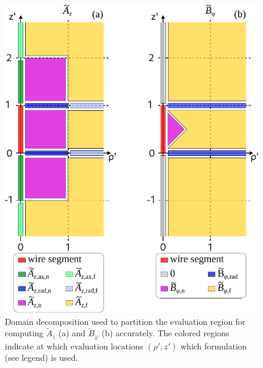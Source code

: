 \begin{figure}[htbp]
    \centering
    \includegraphics{img/sws_regions.pdf}
    \caption{Domain decomposition used to partition the evaluation region
             for computing $\tilde{A}_z$ (a) and $\tilde{B}_\varphi$ (b) accurately.
             The colored regions indicate at which evaluation locations $(\rho',z')$
             which formulation (see legend) is used.}
    \label{fig:sws_regions}
\end{figure}

\FloatBarrier
